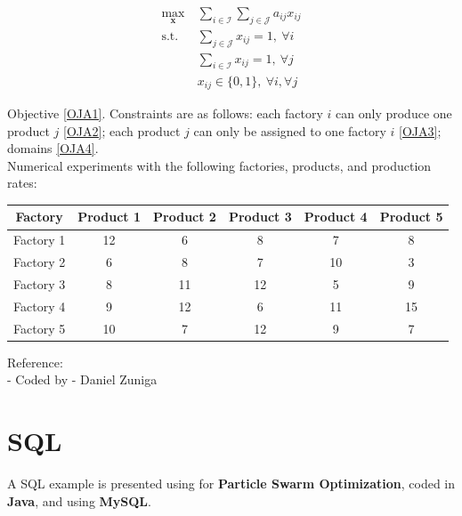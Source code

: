 \documentclass[10pt,bezier]{article}
\begin{document}
\begin{subequations}\label{OJA}
    \begin{align}
    \max_{\pmb{x}} ~& \sum_{i \in \mathcal{I}} \sum_{j \in \mathcal{J}} a_{ij} x_{ij} \label{OJA1}\\
    \text{s.t. } & \sum_{j \in \mathcal{J}} x_{ij} = 1,~ \forall i \label{OJA2}\\
                 & \sum_{i \in \mathcal{I}} x_{ij} = 1,~ \forall j \label{OJA3}\\
                 & x_{ij} \in \{0,1\},~\forall i, \forall j \label{OJA4}
    \end{align}
\end{subequations}

Objective \eqref{OJA1}. Constraints are as follows: each factory $i$ can only produce one product $j$ \eqref{OJA2}; each product $j$ can only be assigned to one factory $i$ \eqref{OJA3}; domains \eqref{OJA4}.\\

Numerical experiments with the following factories, products, and production rates:
\begin{table}[!htbp]
    \centering
    \begin{tabular}{c | c c c c c }
        Factory & Product 1 & Product 2 & Product 3 & Product 4 & Product 5\\ \hline
        Factory 1 & 12 & 6 & 8 & 7 & 8\\
        Factory 2 & 6 & 8 & 7 & 10 & 3\\
        Factory 3 & 8 & 11 & 12 & 5 & 9\\
        Factory 4 & 9 & 12 & 6 & 11 & 15\\
        Factory 5 & 10 & 7 & 12 & 9 & 7
    \end{tabular}
\end{table}

\noindent Reference:\\
- Coded by - Daniel Zuniga

\newpage
\section{SQL}\label{section8}

A SQL example is presented using for {\color{blue}\textbf{Particle Swarm Optimization}}, coded in {\color{blue}\textbf{Java}}, and using {\color{blue}\textbf{MySQL}}.
\end{document}
